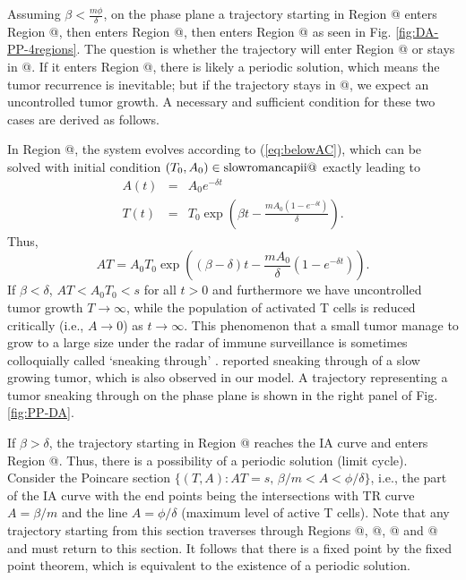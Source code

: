 \documentclass[review,authoryear]{elsarticle}
\makeatletter
\newcommand*{\rom}[1]{\expandafter\@slowromancap\romannumeral #1@}
\makeatother
\begin{document}
Assuming $\beta<\frac{m\phi}{\delta}$, on the phase plane a trajectory starting in Region \rom{3}
enters Region \rom{4}, then enters Region \rom{1}, then enters Region \rom{2} as seen in Fig. \ref{fig:DA-PP-4regions}.
The question is whether the trajectory will enter Region \rom{3} or stays in \rom{2}. If it enters Region \rom{3},
there is likely a periodic solution, which means the tumor recurrence is inevitable; but if the trajectory stays in \rom{2}, we expect an uncontrolled tumor growth. A necessary and sufficient condition for these two cases are derived as follows.

In Region \rom{2}, the system evolves according to (\ref{eq:belowAC}), which
can be solved with initial condition $(T_{0},A_{0})\in\text{\rom{2}}$
exactly leading to 
\begin{eqnarray}
A(t) & = & A_{0}e^{-\delta t}\nonumber \\
T(t) & = & T_{0}\exp(\beta t-\frac{mA_{0}(1-e^{-\delta t})}{\delta})\label{eq:soln belowAC}.
\end{eqnarray}
Thus,
\begin{equation}
AT=A_{0}T_{0}\exp((\beta-\delta)t-\frac{mA_{0}}{\delta}(1-e^{-\delta t})).
\end{equation} 
If $\beta<\delta$, $AT<A_{0}T_{0}<s$ for all $t>0$ and furthermore
we have uncontrolled tumor growth $T\to\infty$, while the population of activated T cells is reduced critically (i.e., $A\to0$) as $t\to\infty$. This phenomenon that a small tumor manage to grow to a large size under the radar of immune surveillance is sometimes colloquially called `sneaking through' \citep{KUZNETSOV1994}.  \cite{George2018} reported sneaking through of a slow growing tumor, which is also observed in our
model. A trajectory representing a tumor sneaking through on the phase
plane is shown in the right panel of Fig. \ref{fig:PP-DA}. 

If $\beta>\delta$, the trajectory starting in Region \rom{2} reaches the IA curve 
and enters Region \rom{3}. Thus, there is a possibility of a periodic solution (limit cycle). Consider
the Poincare section $\{(T,A):AT=s,\,\beta/m<A<\phi/\delta \}$, i.e., the part of the IA curve with the end points being 
the intersections with TR curve $A=\beta/m$ 
and the line $A=\phi / \delta$ (maximum level of active T cells).
Note that any trajectory starting from this section traverses through Regions \rom{1}, \rom{2}, \rom{3} and \rom{4} and must
return to this section. It follows that there is
a fixed point by the fixed point theorem, which is equivalent to the existence of a periodic solution. 
\end{document}
